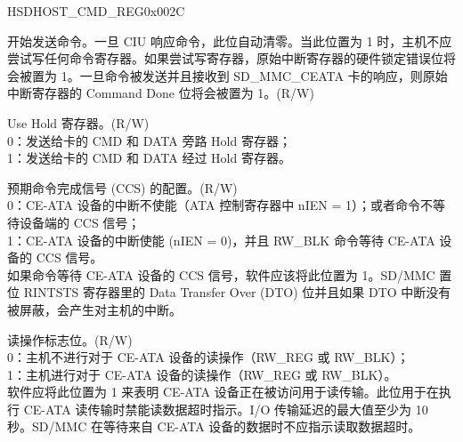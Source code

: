 \begin{register}{H}{SDHOST\_CMD\_REG}{0x{}002C}\label{regdesc:CMDREG}
%
%
%
%
%
%
%
%
%
%
%
%
%
%
%
%
%
%
%
%
%
%
%
\regnewline%
\begin{regdesc}\begin{reglist}
\item [SDHOST\_START\_CMD] 开始发送命令。一旦 CIU 响应命令，此位自动清零。当此位置为 1 时，主机不应尝试写任何命令寄存器。如果尝试写寄存器，原始中断寄存器的硬件锁定错误位将会被置为 1。一旦命令被发送并且接收到 SD\_MMC\_CEATA 卡的响应，则原始中断寄存器的 Command Done 位将会被置为 1。(R/W)
\item [SDHOST\_USE\_HOLE]Use Hold 寄存器。(R/W)\\
0：发送给卡的 CMD 和 DATA 旁路 Hold 寄存器；\\
1：发送给卡的 CMD 和 DATA 经过 Hold 寄存器。
\item [SDHOST\_CCS\_EXPECTED] 预期命令完成信号 (CCS) 的配置。(R/W)\\
0：CE-ATA 设备的中断不使能（ATA 控制寄存器中 nIEN = 1）；或者命令不等待设备端的 CCS 信号；\\
1：CE-ATA 设备的中断使能 (nIEN = 0)，并且 RW\_BLK 命令等待 CE-ATA 设备的 CCS 信号。\\
如果命令等待 CE-ATA 设备的 CCS 信号，软件应该将此位置为 1。SD/MMC 置位 RINTSTS 寄存器里的 Data Transfer Over (DTO) 位并且如果 DTO 中断没有被屏蔽，会产生对主机的中断。
\item [SDHOST\_READ\_CEATA\_DEVICE] 读操作标志位。(R/W)\\
0：主机不进行对于 CE-ATA 设备的读操作（RW\_REG 或 RW\_BLK）；\\
1：主机进行对于 CE-ATA 设备的读操作（RW\_REG 或 RW\_BLK）。\\
软件应将此位置为 1 来表明 CE-ATA 设备正在被访问用于读传输。此位用于在执行 CE-ATA 读传输时禁能读数据超时指示。I/O 传输延迟的最大值至少为 10 秒。SD/MMC 在等待来自 CE-ATA 设备的数据时不应指示读取数据超时。
\item [见下页...]
\end{reglist}\end{regdesc}
\end{register}
